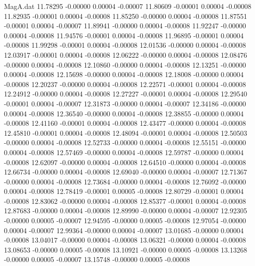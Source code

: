 \begin{filecontents}{MagA.dat}
  11.78295   -0.00000    0.00004   -0.00007
  11.80609   -0.00001    0.00004   -0.00008
  11.82935   -0.00001    0.00004   -0.00008
  11.85250   -0.00000    0.00004   -0.00008
  11.87551   -0.00001    0.00004   -0.00007
  11.89941   -0.00000    0.00004   -0.00008
  11.92247   -0.00000    0.00004   -0.00008
  11.94576   -0.00001    0.00004   -0.00008
  11.96895   -0.00001    0.00004   -0.00008
  11.99298   -0.00001    0.00004   -0.00008
  12.01536   -0.00000    0.00004   -0.00008
  12.03917   -0.00001    0.00004   -0.00008
  12.06222   -0.00000    0.00004   -0.00008
  12.08476   -0.00000    0.00004   -0.00008
  12.10860   -0.00000    0.00004   -0.00008
  12.13251   -0.00000    0.00004   -0.00008
  12.15698   -0.00000    0.00004   -0.00008
  12.18008   -0.00000    0.00004   -0.00008
  12.20237   -0.00000    0.00004   -0.00008
  12.22571   -0.00001    0.00004   -0.00008
  12.24912   -0.00000    0.00004   -0.00008
  12.27227   -0.00001    0.00004   -0.00008
  12.29540   -0.00001    0.00004   -0.00007
  12.31873   -0.00000    0.00004   -0.00007
  12.34186   -0.00000    0.00004   -0.00008
  12.36540   -0.00000    0.00004   -0.00008
  12.38855   -0.00000    0.00004   -0.00008
  12.41160   -0.00001    0.00004   -0.00008
  12.43477   -0.00000    0.00004   -0.00008
  12.45810   -0.00001    0.00004   -0.00008
  12.48094   -0.00001    0.00004   -0.00008
  12.50503   -0.00000    0.00004   -0.00008
  12.52733   -0.00000    0.00004   -0.00008
  12.55151   -0.00000    0.00004   -0.00008
  12.57469   -0.00000    0.00004   -0.00008
  12.59787   -0.00000    0.00004   -0.00008
  12.62097   -0.00000    0.00004   -0.00008
  12.64510   -0.00000    0.00004   -0.00008
  12.66734   -0.00000    0.00004   -0.00008
  12.69040   -0.00000    0.00004   -0.00007
  12.71367   -0.00000    0.00004   -0.00008
  12.73684   -0.00000    0.00004   -0.00008
  12.76092   -0.00000    0.00004   -0.00008
  12.78419   -0.00001    0.00005   -0.00008
  12.80729   -0.00001    0.00004   -0.00008
  12.83062   -0.00000    0.00004   -0.00008
  12.85377   -0.00001    0.00004   -0.00008
  12.87683   -0.00000    0.00004   -0.00008
  12.89990   -0.00000    0.00004   -0.00007
  12.92305   -0.00000    0.00005   -0.00007
  12.94595   -0.00000    0.00005   -0.00008
  12.97054   -0.00000    0.00004   -0.00007
  12.99364   -0.00000    0.00004   -0.00007
  13.01685   -0.00000    0.00004   -0.00008
  13.04017   -0.00000    0.00004   -0.00008
  13.06321   -0.00000    0.00004   -0.00008
  13.08653   -0.00000    0.00005   -0.00008
  13.10921   -0.00000    0.00005   -0.00008
  13.13268   -0.00000    0.00005   -0.00007
  13.15748   -0.00000    0.00005   -0.00008

\end{filecontents}
